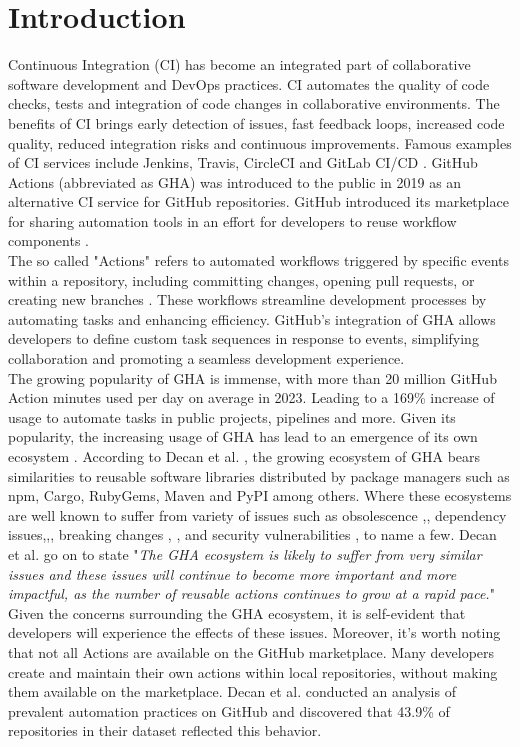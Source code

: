 \documentclass[conference]{IEEEtran}
\begin{document}
\section{Introduction}
Continuous Integration (CI) has become an integrated part of collaborative software development and DevOps practices. CI automates the quality of code checks, tests and integration of code changes in collaborative environments. The benefits of CI brings early detection of issues, fast feedback loops, increased code quality, reduced integration risks and continuous improvements. Famous examples of CI services include Jenkins, Travis, CircleCI and GitLab CI/CD \cite{b1}. GitHub Actions (abbreviated as GHA) was introduced to the public in 2019 as an alternative CI service for GitHub repositories. GitHub introduced its marketplace for sharing automation tools in an effort for developers to reuse workflow components \cite{b2}. \\ 
The so called "Actions" refers to automated workflows triggered by specific events within a repository, including committing changes, opening pull requests, or creating new branches \cite{b14}. These workflows streamline development processes by automating tasks and enhancing efficiency. GitHub's integration of GHA allows developers to define custom task sequences in response to events, simplifying collaboration and promoting a seamless development experience. \\
The growing popularity of GHA is immense, with more than 20 million GitHub Action minutes used per day on average in 2023. Leading to a 169\% increase of usage to automate tasks in public projects,  pipelines and more\cite{b3}. Given its popularity,  the increasing usage of GHA has lead to an emergence of its own ecosystem \cite{b4}.  According to Decan et al. \cite{b4}, the growing ecosystem of GHA bears similarities to reusable software libraries distributed by package managers such as npm, Cargo, RubyGems, Maven and PyPI among others. Where these ecosystems are well known to suffer from variety of issues such as obsolescence \cite{b5},\cite{b6}, dependency issues\cite{b7},\cite{b8},\cite{b9}, breaking changes \cite{b10}, \cite{b11}, and security vulnerabilities \cite{b12}, \cite{b13} to name a few. Decan et al. \cite{b4} go on to state "\textit{The GHA ecosystem is likely to suffer from very similar issues and these issues will continue to become more important and more impactful, as the number of reusable actions continues to grow at a rapid pace.}"\\
Given the concerns surrounding the GHA ecosystem, it is self-evident that developers will experience the effects of these issues.  Moreover, it's worth noting that not all Actions are available on the GitHub marketplace. Many developers create and maintain their own actions within local repositories, without making them available on the marketplace. Decan et al. \cite{b4} conducted an analysis of prevalent automation practices on GitHub and discovered that 43.9\% of repositories in their dataset reflected this behavior.\\
\end{document}
